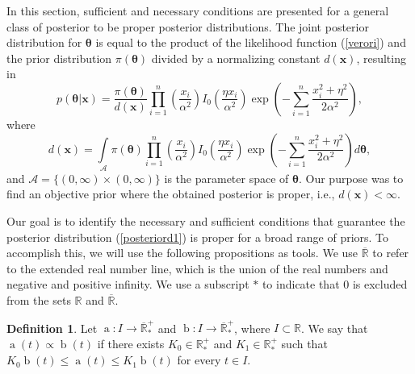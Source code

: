 \documentclass[12pt]{interact}
\newcommand{\f}{\operatorname}
\theoremstyle{plain}%
\theoremstyle{definition}
\newtheorem{definition}[theorem]{Definition}
\theoremstyle{remark}
\begin{document}
In this section, sufficient and necessary conditions are presented for a general class of posterior to be proper posterior distributions. The joint posterior distribution for $\boldsymbol{\theta}$ is equal to the product of the likelihood function (\ref{verori}) and the prior distribution $\pi(\boldsymbol{\theta})$ divided by a normalizing constant $d(\boldsymbol{x})$, resulting in
\begin{equation}\label{posteriord1}
p(\boldsymbol{\theta|x})=\frac{\pi(\boldsymbol{\theta})}{d(\boldsymbol{x})}\prod_{i=1}^{n}\left(\frac{x_i}{\alpha^2}\right)I_0\left( \frac{\eta x_i}{\alpha^2} \right) \exp\left( -\sum_{i=1}^{n}\frac{x_i^2 + \eta^2}{2\alpha^2} \right),
\end{equation} 
where
\begin{equation}\label{posteriord2}
d(\boldsymbol{x})=\int\limits_{\mathcal{A}}\pi(\boldsymbol{\theta})\prod_{i=1}^{n}\left(\frac{x_i}{\alpha^2}\right)I_0\left( \frac{\eta x_i}{\alpha^2} \right) \exp\left( -\sum_{i=1}^{n}\frac{x_i^2 + \eta^2}{2\alpha^2} \right)d\boldsymbol{\theta},
\end{equation}
and $\mathcal{A}=\{(0,\infty)\times(0,\infty)\}$ is the parameter space of $\boldsymbol{\theta}$. Our purpose was to find an objective prior where the obtained posterior is proper, i.e., $d(\boldsymbol{x})<\infty$. 


Our goal is to identify the necessary and sufficient conditions that guarantee the posterior distribution (\ref{posteriord1}) is proper for a broad range of priors. To accomplish this, we will use the following propositions as tools. We use $\overline{\mathbb{R}}$ to refer to the extended real number line, which is the union of the real numbers and negative and positive infinity. We use a subscript $*$ to indicate that $0$ is excluded from the sets $\mathbb{R}$ and $\overline{\mathbb{R}}$.

\begin{definition}\label{definition0} Let $\f{a}:I\to\overline{\mathbb{R}}_*^+$ and $\f{b}:I\to\overline{\mathbb{R}}_*^+$, where $I\subset\mathbb{R}$. We say that $\f{a}(t)\propto \f{b}(t)$ if there exists $K_0\in \mathbb{R}^+_*$ and $K_1\in \mathbb{R}^+_*$ such that $K_0\f{b}(t) \leq \f{a}(t) \leq K_1\f{b}(t)$ for every $t\in I$.
\end{definition}
\end{document}
